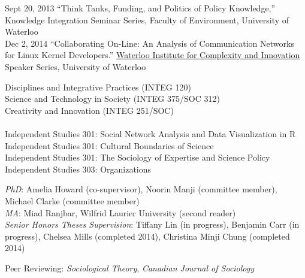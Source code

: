 \documentclass[11pt,usenames,dvipsnames]{article}
\begin{document}

\ind Sept 20, 2013 ``Think Tanks, Funding, and Politics of Policy Knowledge,'' Knowledge Integration Seminar Series, Faculty of Environment, University of Waterloo \\

\ind Dec 2, 2014 ``Collaborating On-Line: An Analysis of Communication Networks for Linux Kernel Developers.'' \href{http://wici.ca/}{Waterloo Institute for Complexity and Innovation} Speaker Series, University of Waterloo \\



\noindent Disciplines and Integrative Practices (INTEG 120) \\
\noindent Science and Technology in Society (INTEG 375/SOC 312) \\
\noindent Creativity and Innovation (INTEG 251/SOC) \\ 
\\
\noindent Independent Studies 301: Social Network Analysis and Data Visualization in R \\ %
\noindent Independent Studies 301: Cultural Boundaries of Science \\ %
\noindent Independent Studies 301: The Sociology of Expertise and Science Policy \\ %
\noindent Independent Studies 303: Organizations \\ %

{}

\noindent \emph{PhD}: Amelia Howard (co-supervisor), Noorin Manji (committee member), Michael Clarke (committee member) \\

\noindent \emph{MA}: Miad Ranjbar, Wilfrid Laurier University (second reader) \\

\noindent \emph{Senior Honors Theses Supervision}: Tiffany Lin (in progress), Benjamin Carr (in progress), Chelsea Mills (completed 2014), Christina Minji Chung (completed 2014) \\



\noindent Peer Reviewing: {\it Sociological Theory}, {\it Canadian Journal of Sociology}\\
\end{document}
